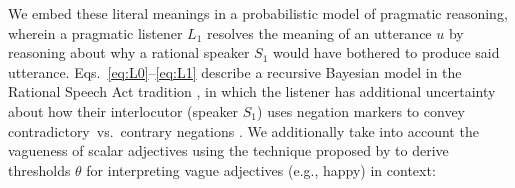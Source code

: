\documentclass[floatsintext,doc]{apa6}
\begin{document}


We embed these literal meanings in a probabilistic model of pragmatic reasoning, wherein a pragmatic listener $L_1$ resolves the meaning of an utterance $u$ by reasoning about why a rational speaker $S_1$ would have bothered to produce said utterance.
Eqs.~\ref{eq:L0}--\ref{eq:L1} describe a recursive Bayesian model in the Rational Speech Act tradition \cite{Franke2015a, Goodman2016:RSA}, in which the listener  has additional uncertainty about how their interlocutor (speaker $S_1$) uses negation markers to convey contradictory~vs.~contrary negations \cite{Bergen2016}.
We additionally take into account the vagueness of scalar adjectives using the technique proposed by  to derive thresholds \(\theta\) for interpreting vague adjectives (e.g., happy) in context:


\vspace*{-0.5cm}
\end{document}
